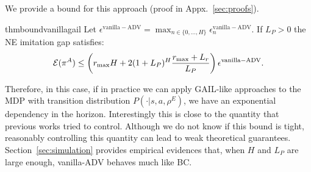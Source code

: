 \documentclass{article}
\begin{document}
We provide a bound for this approach (proof in Appx.~\ref{sec:proofs}).
\begin{restatable}{thm}{boundvanillagail}
\label{thm:bound-vanilla-ADV}
    Let $\epsilon^{\mathrm{vanilla-ADV}} = \max_{n\in\{0,\dots,H\}} \epsilon_n^{\mathrm{vanilla-ADV}}$.
    If $L_P>0$  the NE imitation gap satisfies:
    \begin{equation}
        \mathcal{E}(\pi^{A})\leq\left(r_{\max}H+2(1+L_{P})^{H}\frac{r_{\text{max}}+L_{r}}{L_{P}}\right)\epsilon^{\mathrm{vanilla-ADV}}.
    \end{equation}
\end{restatable}
Therefore, in this case, if in practice we can apply GAIL-like approaches to the MDP with transition distribution $P(\cdot|s,a,\rho^E)$, we have an exponential dependency in the horizon.
Interestingly this is close to the quantity that previous works \cite{chen2021adversarial,chen2022individual} tried to control. 
Although we do not know if this bound is tight, reasonably controlling this quantity can lead to weak theoretical guarantees.
%
Section~\ref{sec:simulation} provides empirical evidences that, when $H$ and $L_P$ are large enough, vanilla-ADV behaves much like BC.
\end{document}
